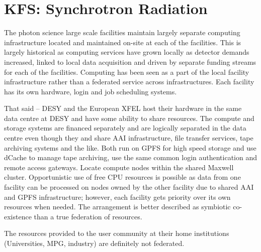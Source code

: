 \section{KFS: Synchrotron Radiation}


The photon science large scale facilities maintain largely separate
computing infrastructure located and maintained on-site at each of the
facilities.   This is largely historical as computing services have
grown locally as detector demands increased, linked to local data
acquisition and driven by separate funding streams for each of the
facilities.  Computing has been seen as a part of the local facility
infrastructure rather than a federated service across infrastructures.
Each facility has its own hardware, login and job scheduling systems. 


That said – DESY and the European XFEL host their hardware in the same
data centre at DESY and have some ability to share resources.   The
compute and storage systems are financed separately and are logically
separated in the data centre even though they and share AAI
infrastructure, file transfer services, tape archiving systems and the
like.  Both run on GPFS for high speed storage and use dCache to manage
tape archiving, use the same common login authentication and remote
access gateways. Locate compute nodes within the shared Maxwell cluster.
Opportunistic use of free CPU resources is possible as data from one
facility can be processed on nodes owned by the other facility due to
shared AAI and GPFS infrastructure; however, each facility gets priority
over its own resources when needed.  The arrangement is better described
as symbiotic co-existence than a true federation of resources.


The resources provided to the user community at their home institutions
(Universities, MPG, industry) are definitely not federated. 
